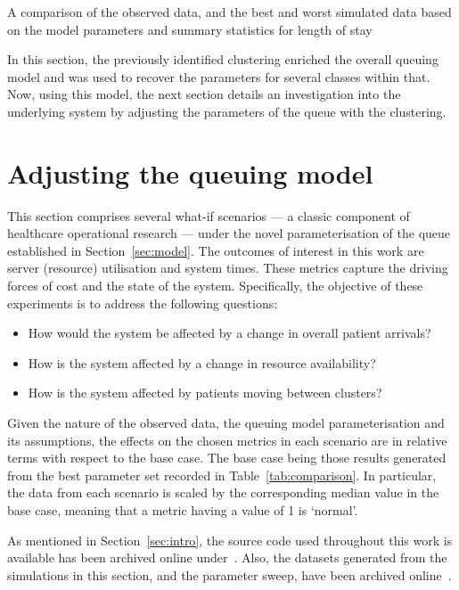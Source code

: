 \begin{table}
    \centering
    \resizebox{\textwidth}{!}{%
        
    }
    \caption{A comparison of the observed data, and the best and worst simulated
        data based on the model parameters and summary statistics for length of
        stay}\label{tab:comparison}
\end{table}

In this section, the previously identified clustering enriched the overall
queuing model and was used to recover the parameters for several classes within
that. Now, using this model, the next section details an investigation into the
underlying system by adjusting the parameters of the queue with the clustering.

\section{Adjusting the queuing model}\label{sec:scenarios}

This section comprises several what-if scenarios --- a classic component of
healthcare operational research --- under the novel parameterisation of the
queue established in Section~\ref{sec:model}. The outcomes of interest in this
work are server (resource) utilisation and system times. These metrics capture
the driving forces of cost and the state of the system. Specifically, the
objective of these experiments is to address the following questions:
\begin{itemize}
    \item How would the system be affected by a change in overall patient
        arrivals?
    \item How is the system affected by a change in resource availability?
    \item How is the system affected by patients moving between clusters?
\end{itemize}

Given the nature of the observed data, the queuing model parameterisation and
its assumptions, the effects on the chosen metrics in each scenario are in
relative terms with respect to the base case. The base case being those results
generated from the best parameter set recorded in Table~\ref{tab:comparison}. In
particular, the data from each scenario is scaled by the corresponding median
value in the base case, meaning that a metric having a value of 1 is ‘normal’.

As mentioned in Section~\ref{sec:intro}, the source code used throughout this
work is available has been archived online under~.
Also, the datasets generated from the simulations in this section, and the
parameter sweep, have been archived online~.

